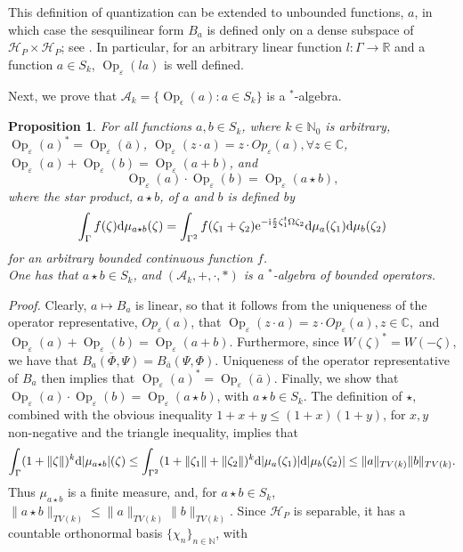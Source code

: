 \documentclass[11pt]{article}
\DeclareMathOperator{\Op}{Op}
\newcommand{\nn}{\mathbb{N}}
\newcommand{\rr}{\mathbb{R}}
\renewcommand{\d}{{\rm d}}
\newcommand{\e}{{\rm e}}
\renewcommand{\i}{{\rm i}}
\newtheorem{proposition}[theorem]{Proposition}
\begin{document}
This definition of quantization can be extended to unbounded functions, $a$, in which case the sesquilinear form 
$B_a$ is defined only on a dense subspace of $\mathcal H_P \times \mathcal{H}_P$; see \cite[\S VIII.6]{reed1980methods}. 
In particular, for an arbitrary linear function $l:\Gamma\to \rr$ and a function $a\in S_k$, $\Op_\varepsilon(la)$ is well defined.

Next, we prove that $\mathcal A_k=\{\Op_\epsilon(a): a\in S_k\}$ is a $^{*}$-algebra.
\begin{proposition}\label{prop:algebra}
For all functions $a,b\in S_k$, where $k \in \mathbb{N}_0$ is arbitrary, $\Op_{\varepsilon}(a)^*=\Op_{\varepsilon}(\bar a)$, 
$\Op_{\varepsilon}(z\cdot a)= z \cdot Op_{\varepsilon}(a), \forall z\in \mathbb{C}$, $\Op_\varepsilon(a)+\Op_\varepsilon(b)=\Op_\varepsilon(a + b)$, and 
$$\Op_\varepsilon(a)\cdot \Op_\varepsilon(b)=\Op_\varepsilon(a\star b),$$
where the star product, $a\star b$, of $a$ and $b$ is defined by
$$ \int_\Gamma f(\zeta)\d\mu_{a\star b}(\zeta)=\int_{\Gamma^2} f(\zeta_1+\zeta_2) \e^{-\i\frac\varepsilon2 \zeta_1^t\Omega\zeta_2}\d\mu_a(\zeta_1)\d\mu_b(\zeta_2)$$
for an arbitrary bounded continuous function $f$. \\
One has that $a\star b\in S_k$, and $(\mathcal A_k, +, \cdot, *)$ is a $^{*}$-algebra of bounded operators.
\end{proposition}
\noindent \textit{Proof.} Clearly, $a\mapsto B_a$ is linear, so that it follows from the uniqueness of the operator representative, 
$Op_{\varepsilon}(a)$, that $\Op_{\varepsilon}(z\cdot a)= z \cdot Op_{\varepsilon}(a), z \in \mathbb{C},$ and 
$\Op_\varepsilon(a)+\Op_\varepsilon(b)=\Op_\varepsilon(a+b)$. 
Furthermore, since $W(\zeta)^*=W(-\zeta)$, we have that $\overline{B_a(\Phi,\Psi)}=B_{\bar a}(\Psi,\Phi)$. 
Uniqueness of the operator representative of $B_a$ then implies that $\Op_\varepsilon(a)^*=\Op_{\varepsilon}(\bar a)$.
Finally, we show that $\Op_\varepsilon(a)\cdot \Op_{\varepsilon}(b)=\Op_\varepsilon(a\star b)$, with $a\star b\in S_k$. 
The definition of $\star$, combined with the obvious inequality $1+x+y\leq (1+x)(1+y)$, for $x, y$ non-negative
and the triangle inequality, implies that
$$\int_\Gamma  (1+\|\zeta\|)^k\d|\mu_{a\star b}|(\zeta)\leq\int_{\Gamma^2}(1+\|\zeta_1\|+\|\zeta_2\|)^k\d|\mu_a(\zeta_1)|\d|\mu_b(\zeta_2)|\leq\|a\|_{TV(k)}\|b\|_{TV(k)}.$$
Thus $\mu_{a\star b}$ is a finite measure, and, for $a\star b\in S_k$, $\|a\star b\|_{TV(k)}\leq \|a\|_{TV(k)}\|b\|_{TV(k)}$.
Since $\mathcal H_P$ is separable, it has a countable orthonormal basis $\{\chi_n\}_{n\in \nn}$, with 
\end{document}
